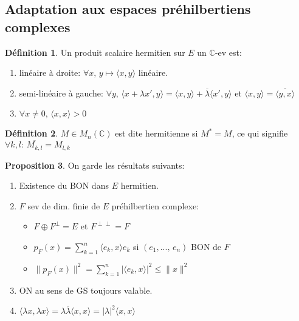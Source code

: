 \documentclass[10pt,a4paper]{article}
\theoremstyle{definition}
\newtheorem{proposition}{Proposition}[section]
\newtheorem{definition}[proposition]{Définition}
\begin{document}
\subsection{Adaptation aux espaces préhilbertiens complexes}
\begin{definition}
    Un produit scalaire hermitien sur \(E\) un \(\mathbb{C}\)-ev est:
    \begin{enumerate}
        \item linéaire à droite: \(\forall x,\, y \mapsto \langle x, y \rangle\) linéaire.
        \item semi-linéaire à gauche: \(\forall y ,\, \langle x + \lambda x', y \rangle = \langle x, y \rangle + \overline{\lambda} \langle x', y \rangle\) et \(\langle x, y \rangle = \overline{\langle y, x \rangle}\)
        \item \(\forall x \neq 0,\, \langle x, x \rangle > 0\)
    \end{enumerate}
\end{definition}
\begin{definition}
    \(M \in M_n(\mathbb{C})\) est dite hermitienne si \(M^* = M\), ce qui signifie \(\forall k, l :\, \overline{M_{k, l}} = M_{l, k}\)
\end{definition}
\begin{proposition}
    On garde les résultats suivants:
    \begin{enumerate}
        \item Existence du BON dans \(E\) hermitien.
        \item \(F\) sev de dim. finie de \(E\) préhilbertien complexe: \begin{itemize}
            \item \(F \oplus F^\perp = E\) et \(F^{\perp \perp} = F\)
            \item \(p_F(x) = \sum\limits_{k = 1}^{n} \langle e_k, x \rangle e_k\) si \((e_1, ...,\, e_n)\) BON de \(F\)
            \item \(\lVert p_F(x) \rVert^2 = \sum\limits_{k = 1}^{n} | \langle e_k, x \rangle |^2 \leq \lVert x \rVert^2\)
        \end{itemize}
        \item ON au sens de GS toujours valable.
        \item \(\langle \lambda x, \lambda x \rangle = \lambda \overline{\lambda} \langle x, x \rangle = |\lambda|^2 \langle x, x \rangle \)
    \end{enumerate}
\end{proposition}
\end{document}
